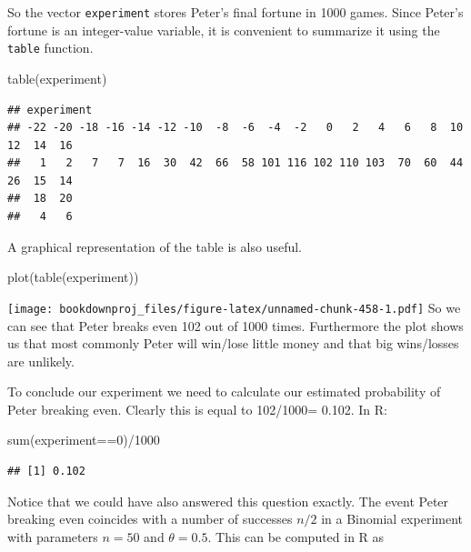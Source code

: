\documentclass[
]{book}
\newenvironment{Shaded}{\begin{snugshade}}{\end{snugshade}}
\newcommand{\DecValTok}[1]{\textcolor[rgb]{0.00,0.00,0.81}{#1}}
\newcommand{\FunctionTok}[1]{\textcolor[rgb]{0.00,0.00,0.00}{#1}}
\newcommand{\NormalTok}[1]{#1}
\newcommand{\SpecialCharTok}[1]{\textcolor[rgb]{0.00,0.00,0.00}{#1}}
\theoremstyle{definition}
\theoremstyle{definition}
\theoremstyle{definition}
\theoremstyle{definition}
\theoremstyle{remark}
\begin{document}
So the vector \texttt{experiment} stores Peter's final fortune in 1000 games. Since Peter's fortune is an integer-value variable, it is convenient to summarize it using the \texttt{table} function.

\begin{Shaded}
\begin{Highlighting}[]
\FunctionTok{table}\NormalTok{(experiment)}
\end{Highlighting}
\end{Shaded}

\begin{verbatim}
## experiment
## -22 -20 -18 -16 -14 -12 -10  -8  -6  -4  -2   0   2   4   6   8  10  12  14  16 
##   1   2   7   7  16  30  42  66  58 101 116 102 110 103  70  60  44  26  15  14 
##  18  20 
##   4   6
\end{verbatim}

A graphical representation of the table is also useful.

\begin{Shaded}
\begin{Highlighting}[]
\FunctionTok{plot}\NormalTok{(}\FunctionTok{table}\NormalTok{(experiment))}
\end{Highlighting}
\end{Shaded}

\texttt{[image: bookdownproj\_files/figure-latex/unnamed-chunk-458-1.pdf]}
So we can see that Peter breaks even 102 out of 1000 times. Furthermore the plot shows us that most commonly Peter will win/lose little money and that big wins/losses are unlikely.

To conclude our experiment we need to calculate our estimated probability of Peter breaking even. Clearly this is equal to 102/1000= 0.102. In R:

\begin{Shaded}
\begin{Highlighting}[]
\FunctionTok{sum}\NormalTok{(experiment}\SpecialCharTok{==}\DecValTok{0}\NormalTok{)}\SpecialCharTok{/}\DecValTok{1000}
\end{Highlighting}
\end{Shaded}

\begin{verbatim}
## [1] 0.102
\end{verbatim}

Notice that we could have also answered this question exactly. The event Peter breaking even coincides with a number of successes \(n/2\) in a Binomial experiment with parameters \(n=50\) and \(\theta = 0.5\). This can be computed in R as
\end{document}
